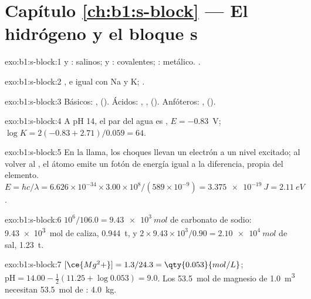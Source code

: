 \section*{Capítulo \ref{ch:b1:s-block} --- El hidrógeno y el bloque s}

\begin{solution}{exo:b1:s-block:1}
 y : salinos;  y : covalentes;
: metálico. .
\end{solution}

\begin{solution}{exo:b1:s-block:2}
, e igual con Na y K;
.
\end{solution}

\begin{solution}{exo:b1:s-block:3}
Básicos: ,  (). Ácidos:
, ,  (). Anfóteros:
,  ().
\end{solution}

\begin{solution}{exo:b1:s-block:4}
A pH 14, el par del agua es , $E = -0.83$~V;
$\log K = 2(-0.83 + 2.71)/0.059 = 64$.
\end{solution}

\begin{solution}{exo:b1:s-block:5}
En la llama, los choques llevan un electrón a un nivel excitado; al
volver al , el átomo emite un fotón de energía igual a
la diferencia, propia del elemento. $E = hc/\lambda = 6.626 \times 10^{-34} \times
3.00 \times 10^8/(589 \times 10^{-9}) = \qty{3.375e-19}{J} = \qty{2.11}{eV}$.
\end{solution}

\begin{solution}{exo:b1:s-block:6}
$10^6/106.0 = \qty{9.43e3}{mol}$ de carbonato de sodio: \qty{9.43e3}{mol}
de caliza, \qty{0.944}{t}, y $2 \times 9.43 \times 10^3/0.90 =
\qty{2.10e4}{mol}$ de sal, \qty{1.23}{t}.
\end{solution}

\begin{solution}{exo:b1:s-block:7}
$[\ce{Mg^2+}] = 1.3/24.3 = \qty{0.053}{mol/L}$; $\mathrm{pH} = 14.00 -
\frac12(11.25 + \log 0.053) = 9.0$. Los \qty{53.5}{mol} de magnesio de
\qty{1.0}{m^3} necesitan \qty{53.5}{mol} de : \qty{4.0}{kg}.
\end{solution}

